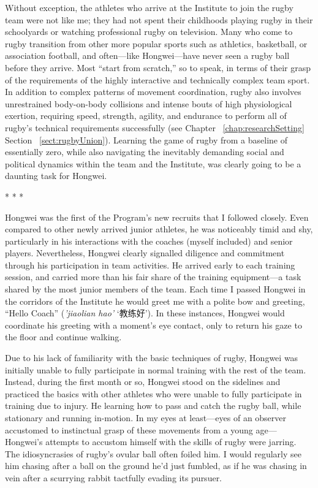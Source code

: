 \begin{CJK}{UTF8}{gbsn}
Without exception, the athletes who arrive at the Institute to join the rugby team were not like me; they had not spent their childhoods playing rugby in their schoolyards or watching professional rugby on television. Many who come to rugby transition from other more popular sports such as athletics, basketball, or association football, and often---like Hongwei---have never seen a rugby ball before they arrive.  Most ``start from scratch,'' so to speak, in terms of their grasp of the requirements of the highly interactive and technically complex team sport. In addition to complex patterns of movement coordination, rugby also involves unrestrained body-on-body collisions and intense bouts of high physiological exertion, requiring speed, strength, agility, and endurance to perform all of rugby's technical requirements successfully (see Chapter ~\ref{chap:researchSetting} Section ~\ref{sect:rugbyUnion}).  Learning the game of rugby from a baseline of essentially zero, while also navigating the inevitably demanding social and political dynamics within the team and the Institute, was clearly going to be a daunting task for Hongwei.


                        \begin{center}
                          * * *
                        \end{center}

Hongwei was the first of the Program’s new recruits that I followed closely.  Even compared to other newly arrived junior athletes, he was noticeably timid and shy, particularly in his interactions with the coaches (myself included) and senior players. Nevertheless, Hongwei clearly signalled diligence and commitment through his participation in team activities.  He arrived early to each training session, and carried more than his fair share of the training equipment---a task shared by the most junior members of the team.  Each time I passed Hongwei in the corridors of the Institute he would greet me with a polite bow and greeting, ``Hello Coach'' (\textit{'jiaolian hao'} `教练好').  In these instances, Hongwei would coordinate his greeting with a moment's eye contact, only to return his gaze to the floor and continue walking.

Due to his lack of familiarity with the basic techniques of rugby, Hongwei was initially unable to fully participate in normal training with the rest of the team.  Instead, during the first month or so, Hongwei stood on the sidelines and practiced the basics with other athletes who were unable to fully participate in training due to injury.  He learning how to pass and catch the rugby ball, while stationary and running in-motion.  In my eyes at least---eyes of an observer accustomed to instinctual grasp of these movements from a young age---Hongwei's attempts to accustom himself with the skills of rugby were jarring.  The idiosyncrasies of rugby's ovular ball often foiled him.  I would regularly see him chasing after a ball on the ground he'd just fumbled, as if he was chasing in vein after a scurrying rabbit tactfully evading its pursuer.


\end{CJK}
